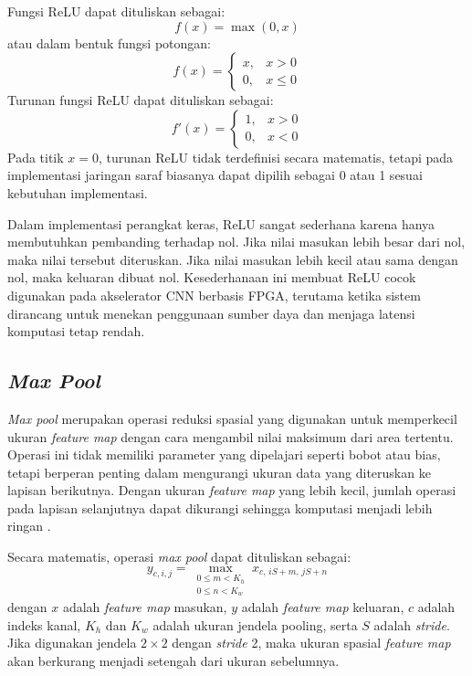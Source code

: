     Fungsi ReLU dapat dituliskan sebagai:
    \begin{equation}
        f(x) =
        \max(0, x)
        \label{eq:relu}
    \end{equation}
    atau dalam bentuk fungsi potongan:
    \begin{equation}
        f(x) =
        \begin{cases}
            x, & x > 0 \\
            0, & x \leq 0
        \end{cases}
        \label{eq:relu_piecewise}
    \end{equation}
    Turunan fungsi ReLU dapat dituliskan sebagai:
    \begin{equation}
        f'(x) =
        \begin{cases}
            1, & x > 0 \\
            0, & x < 0
        \end{cases}
        \label{eq:relu_derivative}
    \end{equation}
    Pada titik $x=0$, turunan ReLU tidak terdefinisi secara matematis, tetapi pada implementasi jaringan saraf biasanya dapat dipilih sebagai 0 atau 1 sesuai kebutuhan implementasi.

    Dalam implementasi perangkat keras, ReLU sangat sederhana karena hanya membutuhkan pembanding terhadap nol. Jika nilai masukan lebih besar dari nol, maka nilai tersebut diteruskan. Jika nilai masukan lebih kecil atau sama dengan nol, maka keluaran dibuat nol. Kesederhanaan ini membuat ReLU cocok digunakan pada akselerator CNN berbasis FPGA, terutama ketika sistem dirancang untuk menekan penggunaan sumber daya dan menjaga latensi komputasi tetap rendah.

    \subsection{\emph{Max Pool}}
    \emph{Max pool} merupakan operasi reduksi spasial yang digunakan untuk memperkecil ukuran \emph{feature map} dengan cara mengambil nilai maksimum dari area tertentu. Operasi ini tidak memiliki parameter yang dipelajari seperti bobot atau bias, tetapi berperan penting dalam mengurangi ukuran data yang diteruskan ke lapisan berikutnya. Dengan ukuran \emph{feature map} yang lebih kecil, jumlah operasi pada lapisan selanjutnya dapat dikurangi sehingga komputasi menjadi lebih ringan \cite{Goodfellow2016DeepLearning,AlexNetPaper}.

    Secara matematis, operasi \emph{max pool} dapat dituliskan sebagai:
    \begin{equation}
        y_{c,i,j} =
        \max_{\substack{0 \leq m < K_h \\ 0 \leq n < K_w}}
        x_{c,\,iS+m,\,jS+n}
        \label{eq:maxpool}
    \end{equation}
    dengan $x$ adalah \emph{feature map} masukan, $y$ adalah \emph{feature map} keluaran, $c$ adalah indeks kanal, $K_h$ dan $K_w$ adalah ukuran jendela pooling, serta $S$ adalah \emph{stride}. Jika digunakan jendela $2 \times 2$ dengan \emph{stride} 2, maka ukuran spasial \emph{feature map} akan berkurang menjadi setengah dari ukuran sebelumnya.

